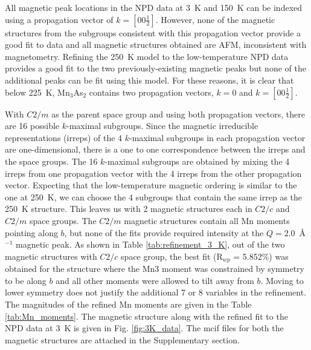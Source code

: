 \documentclass[10pt,doublespacing,edeposit]{uiucthesis2020}
\begin{document}
\begin{mainmatter}
All magnetic peak locations in the NPD data at 3~K and 150~K can be indexed using a propagation vector of $k = [00\frac{1}{2}]$. However, none of the magnetic structures from the subgroups consistent with this propagation vector provide a good fit to data and all magnetic structures obtained are AFM, inconsistent with magnetometry. Refining the 250~K model to the low-temperature NPD data provides a good fit to the two previously-existing magnetic peaks but none of the additional peaks can be fit using this model. For these reasons, it is clear that below 225~K, Mn$_3$As$_2$ contains two propagation vectors, $k = 0$ and $k = [00\frac{1}{2}]$. 


With $C2/m$ as the parent space group and using both propagation vectors, there are 16 possible $k$-maximal subgroups. 
Since the magnetic irreducible representations (irreps) of the 4 $k$-maximal subgroups in each propagation vector are one-dimensional, there is a one to one correspondence between the irreps and the space groups. The 16 $k$-maximal subgroups are obtained by mixing the 4 irreps from one propagation vector with the 4 irreps from the other propagation vector.
Expecting that the low-temperature magnetic ordering is similar to the one at 250~K, we can choose the 4 subgroups that contain the same irrep as the 250~K structure. 
This leaves us with 2 magnetic structures each in $C2/c$ and $C2/m$ space groups. The $C2/m$  magnetic structures contain all Mn moments pointing along $b$, but none of the fits provide required intensity at the $Q = 2.0$~\AA$^{-1}$ magnetic peak. As shown in Table \ref{tab:refinement_3_K}, out of the two magnetic structures with $C2/c$ space group, the best fit (R$_{wp}$ = 5.852\%) was obtained for the structure where the Mn3 moment was constrained by symmetry to be along $b$ and all other moments were allowed to tilt away from $b$. Moving to lower symmetry does not justify the additional 7 or 8 variables in the refinement. The magnitudes of the refined Mn moments are given in the Table \ref{tab:Mn_moments}. The magnetic structure along with the refined fit to the NPD data at 3~K is given in Fig. \ref{fig:3K_data}. The mcif files for both the magnetic structures are attached in the Supplementary section.


\end{mainmatter}
\end{document}
